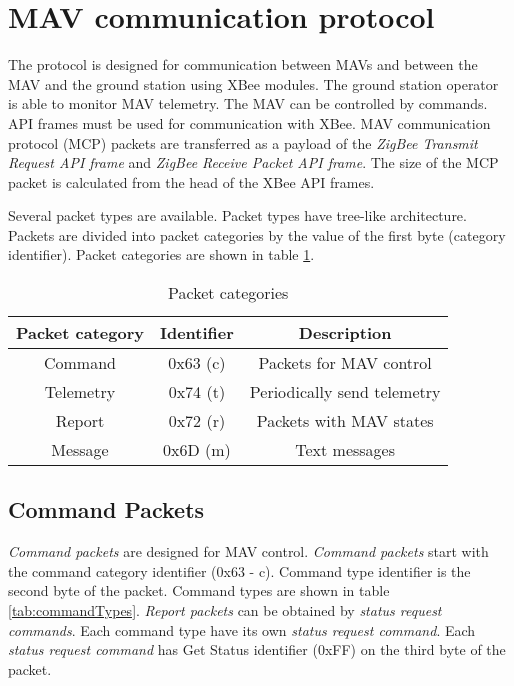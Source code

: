 \section{MAV communication protocol}
\label{sec:MCP}
The protocol is designed for communication between MAVs and between the MAV and the ground station using XBee modules. The ground station operator is able to monitor MAV telemetry. The MAV can be controlled by commands. API frames must be used for communication with XBee. MAV communication protocol (MCP) packets are transferred as a payload of the \textit{ZigBee Transmit Request API frame} and \textit{ZigBee Receive Packet API frame}. The size of the MCP packet is calculated from the head of the XBee API frames. 

Several packet types are available. Packet types have tree-like architecture. Packets are divided into packet categories by the value of the first byte (category identifier). Packet categories are shown in table \ref{tab:packetCategories}.

\begin{table}[H]
\begin{center}
\begin{tabular}{c c c}
\toprule
\rowcolor[HTML]{FFFC9E} 
\textbf{Packet category} & \textbf{Identifier} & \textbf{Description} \\ \midrule
Command 		 & 0x63 (c)   & Packets for MAV control  		\\  [1ex] 
Telemetry        & 0x74 (t)   & Periodically send telemetry     \\ [1ex] 
Report           & 0x72 (r)   & Packets with MAV states         \\ [1ex] 
Message 		 & 0x6D (m)   & Text messages    		    	\\ [1ex] 
 \bottomrule
\end{tabular}
\end{center}
\caption{Packet categories}
\label{tab:packetCategories}
\end{table}



\subsection{Command Packets}
\label{sec:commandsPackets}
\textit{Command packets} are designed for MAV control. 
\textit{Command packets} start with the command category identifier (0x63 - c). Command type identifier is the second byte of the packet. Command types are shown in table \ref{tab:commandTypes}. \textit{Report packets} can be obtained by \textit{status request commands}. Each command type have its own \textit{status request command}. Each \textit{status request command} has Get Status identifier (0xFF) on the third byte of the packet.


